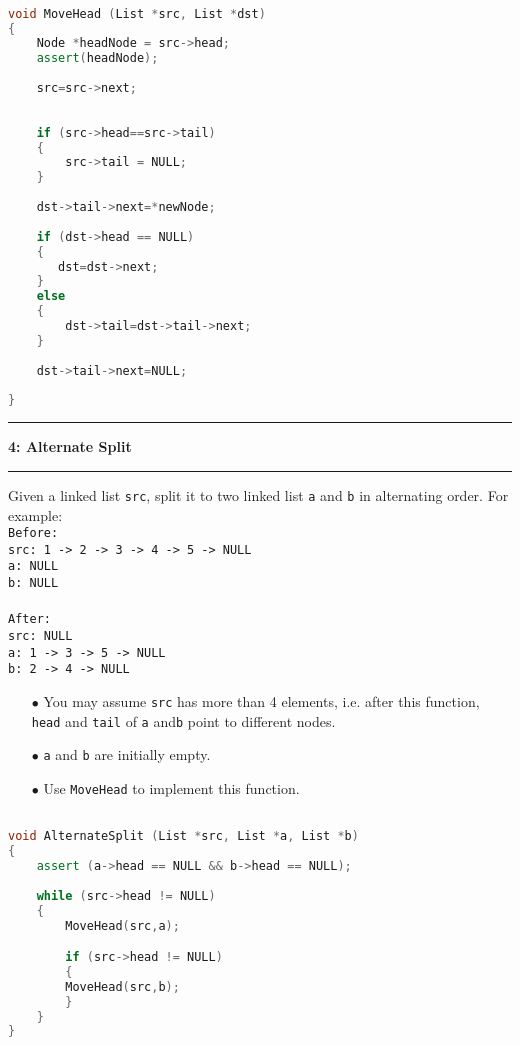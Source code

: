 \documentclass[10.5pt]{article}
\newcommand\question[2]{\vspace{.25in}\hrule\textbf{#1: #2}\vspace{.5em}\hrule\vspace{.10in}}
\begin{document}
\hrulefill
\begin{lstlisting}[language=C++]

void MoveHead (List *src, List *dst)
{
    Node *headNode = src->head;
    assert(headNode);
    
    src=src->next;
    
        
    if (src->head==src->tail)
    {
        src->tail = NULL;
    }
    
    dst->tail->next=*newNode;
    
    if (dst->head == NULL)
    {
       dst=dst->next;
    }
    else
    {
        dst->tail=dst->tail->next;
    }
    
    dst->tail->next=NULL;
    
}

\end{lstlisting}
\pagebreak

\question{4}{Alternate Split}
Given a linked list \texttt{src}, split it to two linked list  \texttt{a} and \texttt{b} in alternating order. For example:\\

\texttt{Before:}\\
\texttt{src: 1 -> 2 -> 3 -> 4 -> 5 -> NULL}\\
\texttt{a: NULL}\\
\texttt{b: NULL}\\
\\
\texttt{After:}\\
\texttt{src: NULL}\\
\texttt{a: 1 -> 3 -> 5 -> NULL}\\
\texttt{b: 2 -> 4 -> NULL}\\

\begin{enumerate}
	\item[$\bullet$] You may assume \texttt{src} has more than 4 elements, i.e. after this function, \texttt{head} and \texttt{tail} of \texttt{a} and\texttt{b} point to different nodes.
	\item[$\bullet$] \texttt{a} and \texttt{b} are initially empty.
	\item[$\bullet$] Use \texttt{MoveHead} to implement this function.
\end{enumerate}


\hrulefill
\begin{lstlisting}[language=C++]

void AlternateSplit (List *src, List *a, List *b)
{
    assert (a->head == NULL && b->head == NULL);
    
    while (src->head != NULL)
    {
        MoveHead(src,a);

     	if (src->head != NULL)
     	{
     	MoveHead(src,b);
     	}
    }
}

\end{lstlisting}
\pagebreak
\end{document}

